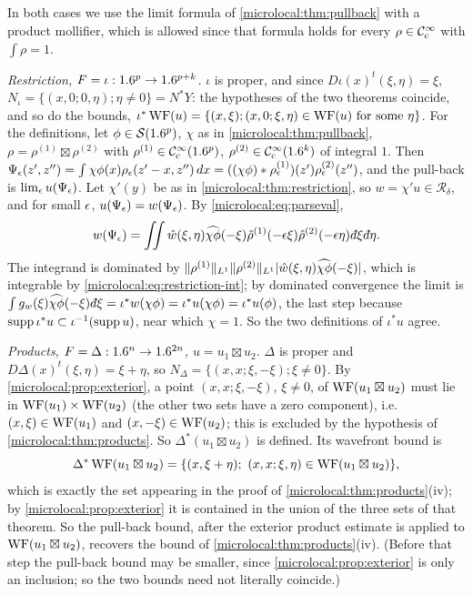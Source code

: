 \subsection*{}
In both cases we use the limit formula of \cref{microlocal:thm:pullback} with a product
mollifier, which is allowed since that formula holds for every $\rho\in\mathcal{C}^\infty_{\mathrm{c}}$ with $\int\rho=1$.

\emph{Restriction, $F=\iota:1.6^p\to1.6^{p+k}$.} $\iota$ is proper, and since $D\iota(x)^t(\xi,\eta)=\xi$,
$N_\iota=\{(x,0;0,\eta);\eta\ne0\}=N^*Y$: the hypotheses of the two theorems coincide, and so do the
bounds,
$\iota^*\operatorname{WF}(u)=\{(x,\xi);(x,0;\xi,\eta)\in\operatorname{WF}(u)\text{ for some }\eta\}$. For the definitions, let
$\phi\in\mathcal{S}(1.6^p)$, $\chi$ as in \cref{microlocal:thm:pullback}, $\rho=\rho^{(1)}\boxtimes\rho^{(2)}$ with
$\rho^{(1)}\in\mathcal{C}^\infty_{\mathrm{c}}(1.6^p)$, $\rho^{(2)}\in\mathcal{C}^\infty_{\mathrm{c}}(1.6^k)$ of integral $1$. Then
$\Psi_\epsilon(z',z'')=\int\chi\phi(x)\rho_\epsilon(z'-x,z'')\,dx=((\chi\phi)*\rho^{(1)}_\epsilon)(z')\rho^{(2)}_\epsilon(z'')$, and
the pull-back is $\lim_\epsilon u(\Psi_\epsilon)$. Let $\chi'(y)$ be as in \cref{microlocal:thm:restriction}, so
$w=\chi'u\in\mathcal R_\delta$, and for small $\epsilon$, $u(\Psi_\epsilon)=w(\Psi_\epsilon)$. By
\eqref{microlocal:eq:parseval},
\begin{equation*}
  w(\Psi_\eps)=\iint\hat w(\xi,\eta)\widehat{\chi\phi}(-\xi)\hat\rho^{(1)}(-\eps\xi)\hat\rho^{(2)}(-\eps\eta)\,
  \dbar\xi\,\dbar\eta .
\end{equation*}
The integrand is dominated by $\lVert \rho^{(1)}\rVert_{L^1}\lVert \rho^{(2)}\rVert_{L^1}\lvert \hat w(\xi,\eta)\widehat{\chi\phi}(-\xi)\rvert$,
which is integrable by \eqref{microlocal:eq:restriction-int}; by dominated convergence the limit is
$\int g_w(\xi)\widehat{\chi\phi}(-\xi)\,\dbar\xi=\iota^*w(\chi\phi)=\iota^*u(\chi\phi)=\iota^*u(\phi)$, the last
step because $\operatorname{supp}\iota^*u\subset\iota^{-1}(\operatorname{supp} u)$, near which $\chi=1$. So the two definitions of
$\iota^*u$ agree.

\emph{Products, $F=\Delta:1.6^n\to1.6^{2n}$, $u=u_1\boxtimes u_2$.} $\Delta$ is proper and
$D\Delta(x)^t(\xi,\eta)=\xi+\eta$, so $N_\Delta=\{(x,x;\xi,-\xi);\xi\ne0\}$. By
\cref{microlocal:prop:exterior}, a point $(x,x;\xi,-\xi)$, $\xi\ne0$, of $\operatorname{WF}(u_1\boxtimes u_2)$ must lie in
$\operatorname{WF}(u_1)\times\operatorname{WF}(u_2)$ (the other two sets have a zero component), i.e.\ $(x,\xi)\in\operatorname{WF}(u_1)$ and
$(x,-\xi)\in\operatorname{WF}(u_2)$; this is excluded by the hypothesis of \cref{microlocal:thm:products}. So
$\Delta^*(u_1\boxtimes u_2)$ is defined. Its wavefront bound is
\begin{equation*}
  \Delta^*\WF(u_1\boxtimes u_2)=\{(x,\xi+\eta);\ (x,x;\xi,\eta)\in\WF(u_1\boxtimes u_2)\},
\end{equation*}
which is exactly the set appearing in the proof of \cref{microlocal:thm:products}(iv); by
\cref{microlocal:prop:exterior} it is contained in the union of the three sets of that theorem. So the
pull-back bound, after the exterior product estimate is applied to $\operatorname{WF}(u_1\boxtimes u_2)$, recovers
the bound of \cref{microlocal:thm:products}(iv). (Before that step the pull-back bound may be smaller,
since \cref{microlocal:prop:exterior} is only an inclusion; so the two bounds need not literally coincide.)

